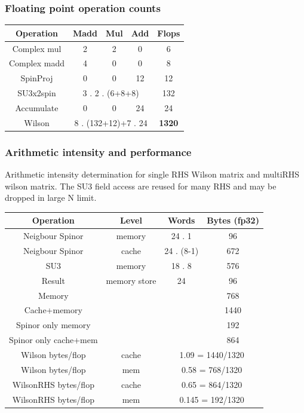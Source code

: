 \documentclass[letter,10pt]{report}
\begin{document}
\subsubsection{Floating point operation counts}

\begin{tabular}{ccccc}
  Operation    & Madd & Mul & Add & Flops \\
  \hline
  Complex mul  & 2 & 2  & 0 & 6 \\
  Complex madd & 4 & 0  & 0 & 8 \\
  SpinProj     & 0 & 0  & 12 & 12 \\
  SU3x2spin   & \multicolumn{3}{c}{ 3 . 2 . (6+8+8) }& 132 \\
  Accumulate  & 0 & 0 & 24 & 24\\
  \hline
  Wilson      & \multicolumn{3}{c}{8 . (132+12)+7 .  24} & {\bf 1320}
\end{tabular}

\subsubsection{Arithmetic intensity and performance}
Arithmetic intensity determination for single RHS Wilson matrix and multiRHS wilson matrix.
The SU3 field access are reused for many RHS and may be dropped in large N limit.

\begin{tabular}{cccc}
  Operation    & Level & Words & Bytes (fp32) \\
  \hline
  Neigbour Spinor       & memory&  24 .  1   & 96   \\
  Neigbour Spinor       & cache &  24 .  (8-1)    & 672  \\
  SU3                   & memory&  18 .  8  & 576 \\
  Result                & memory store & 24 & 96 \\
  \hline
  Memory              & & &  768 \\
  Cache+memory        & & & 1440 \\
  Spinor only memory     & & & 192 \\
  Spinor only cache+mem  & & & 864 \\
  \hline
  Wilson bytes/flop &cache    & \multicolumn{2}{c}{ 1.09 = 1440/1320}\\
  Wilson bytes/flop &mem      &  \multicolumn{2}{c}{ 0.58 = 768/1320}\\
  WilsonRHS bytes/flop& cache    & \multicolumn{2}{c}{ 0.65 = 864/1320}\\
  WilsonRHS bytes/flop& mem      &  \multicolumn{2}{c}{ 0.145 = 192/1320}\\
  \hline
\end{tabular}
\end{document}

